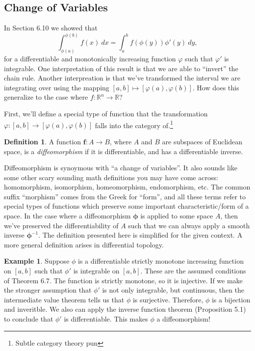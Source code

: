 \documentclass{article}
\newcommand{\R}{\mathbb{R}}
\newcommand{\f}{\mathbf{f}}
\theoremstyle{definition}
\newtheorem{definition}{Definition}[section]
\newtheorem{example}{Example}[section]
\begin{document}
	\subsection{Change of Variables}
	
	In Section 6.10 we showed that
	$$ \int_{\phi(a)}^{\phi(b)}f(x)\ dx=\int_{a}^{b}f(\phi(y))\phi'(y)\ dy,$$ for a differentiable and monotonically increasing function $\varphi$ such that $\varphi'$ is integrable. One interpretation of this result is that we are able to ``invert'' the chain rule. Another interpreation is that we've transformed the interval we are integrating over using the mapping $[a,b]\mapsto [\varphi(a),\varphi(b)]$. How does this generalize to the case where $f:\R^n \to \R$? 
	
	First, we'll define a special type of function that the transformation $\varphi:[a,b]\to [\varphi(a),\varphi(b)]$ falls into the category of.\footnote{Subtle category theory pun} 
	
	\begin{definition}\label{def}
	A function $\f:A\to B$, where $A$ and $B$ are subspaces of Euclidean space, is a \textit{\color{red}diffeomorphism} if it is differentiable, and has a differentiable inverse.
	\end{definition}  
	
	Diffeomorphism is synoymous with ``a change of variables''. It also sounds like some other scary sounding math definitions you may have come across: homomorphism, isomorphism, homeomorphism, endomorphism, etc. The common suffix ``morphism'' comes from the Greek for ``form'', and all these terms refer to special types of functions which preserve some important characteristic/form of a space. In the case where a diffeomorphism $\boldsymbol{\phi}$ is applied to some space $A$, then we've preserved the differentiability of $A$ such that we can always apply a smooth inverse $\boldsymbol{\phi}^{-1}$. The definition presented here is simplified for the given context. A more general definition arises in differential topology. 
	
	\begin{example}
		Suppose $\phi$ is a differentiable strictly monotone increasing function on $[a,b]$ such that $\phi'$ is integrable on $[a,b]$. These are the assumed conditions of Theorem 6.7. The function is strictly monotone, so it is injective. If we make the stronger assumption that $\phi'$ is not only integrable, but continuous, then the intermediate value theorem tells us that $\phi$ is surjective. Therefore, $\phi$ is a bijection and inveritble. We also can apply the inverse function theorem (Proposition 5.1) to conclude that $\phi'$ is differentiable. This makes $\phi$ a diffeomorphism! 
	\end{example}
\end{document}

